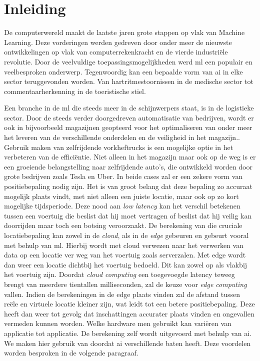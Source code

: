 \chapter{Inleiding}
De computerwereld maakt de laatste jaren grote stappen op vlak van Machine Learning\cite{Minar18}. Deze vorderingen werden gedreven door onder meer de nieuwste ontwikkelingen op vlak van computerrekenkracht en de vierde industri\"ele revolutie\cite{bloem2014fourth}. Door de veelvuldige toepassingsmogelijkheden werd \gls{ml} een populair en veelbesproken onderwerp. Tegenwoordig kan een bepaalde vorm van \gls{ai} in elke sector teruggevonden worden\cite{russell2016artificial}. Van hartritmestoornissen in de medische sector tot commentaarherkenning in de toeristische stiel. 

Een branche in de \gls{ml} die steeds meer in de schijnwerpers staat, is in de logistieke sector\cite{barreto2017industry}. Door de steeds verder doorgedreven automatisatie van bedrijven, wordt er ook in bijvoorbeeld magazijnen geopteerd voor het optimaliseren van onder meer het leveren van de verschillende onderdelen en de veiligheid in het magazijn.. Gebruik maken van zelfrijdende vorkheftrucks is een mogelijke optie in het verbeteren van de effici\"entie. Niet alleen in het magazijn maar ook op de weg is er een groeiende belangstelling naar zelfrijdende auto's, die ontwikkeld worden door grote bedrijven zoals Tesla en Uber. In beide cases zal er een zekere vorm van positiebepaling nodig zijn. Het is van groot belang dat deze bepaling zo accuraat mogelijk plaats vindt, met niet alleen een juiste locatie, maar ook op zo kort mogelijke tijdsperiode. Deze nood aan \textit{low latency} kan het verschil betekenen tussen een voertuig die beslist dat hij moet vertragen of beslist dat hij veilig kan doorrijden maar toch een botsing veroorzaakt. De berekening van die cruciale locatiebepaling kan zowel in de \textit{cloud}, als in de \textit{edge}\cite{edgecomputingLi} gebeuren en gebeurt vooral met behulp van \gls{ml}. Hierbij wordt met cloud verwezen naar het verwerken van data op een locatie ver weg van het voertuig zoals serverzalen. Met edge wordt dan weer een locatie dichtbij het voertuig bedoeld. Dit kan zowel op als vlakbij het voertuig zijn. Doordat \textit{cloud computing} een toegevoegde latency teweeg brengt van meerdere tientallen milliseconden, zal de keuze voor \textit{edge computing} vallen. Indien de berekeningen in de edge plaats vinden zal de afstand tussen re\"ele en virtuele locatie kleiner zijn, wat leidt tot een betere positiebepaling. Deze heeft dan weer tot gevolg dat inschattingen accurater plaats vinden en ongevallen vermeden kunnen worden. Welke hardware men gebruikt kan vari\"eren van applicatie tot applicatie. De berekening zelf wordt uitgevoerd met behulp van \gls{ai}. We maken hier gebruik van doordat \gls{ai} verschillende baten heeft. Deze voordelen worden besproken in de volgende paragraaf.


